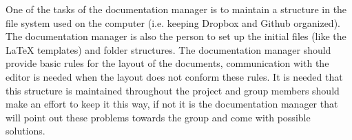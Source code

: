 One of the tasks of the documentation manager is to maintain a structure in the file system used on the computer (i.e. keeping Dropbox and Github organized). The documentation manager is also the person to set up the initial files (like the LaTeX templates) and folder structures. The documentation manager should provide basic rules for the layout of the documents, communication with the editor is needed when the layout does not conform these rules. It is needed that this structure is maintained throughout the project and group members should make an effort to keep it this way, if not it is the documentation manager that will point out these problems towards the group and come with possible solutions. 